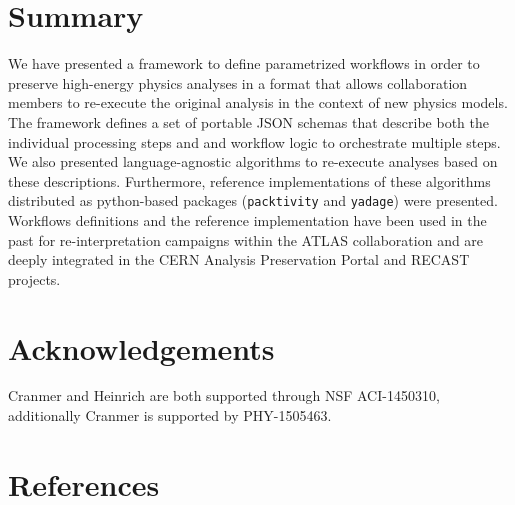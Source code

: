 \documentclass[a4paper]{jpconf}
\begin{document}
\section{Summary}

We have presented a framework to define parametrized workflows in order to preserve high-energy physics analyses in a format that allows collaboration members to re-execute the original analysis in the context of new physics models. The framework defines a set of portable JSON schemas that describe both the individual processing steps and and workflow logic to orchestrate multiple steps. We also presented language-agnostic algorithms to re-execute analyses based on these descriptions. Furthermore, reference implementations of these algorithms distributed as python-based packages (\verb+packtivity+ and \verb+yadage+) were presented. Workflows definitions and the reference implementation have been used in the past for re-interpretation campaigns within the ATLAS collaboration and are deeply integrated in the CERN Analysis Preservation Portal and RECAST projects. 

\section{Acknowledgements}

Cranmer and Heinrich are both supported through NSF ACI-1450310, additionally Cranmer is supported by PHY-1505463.

\section*{References}


\end{document}

